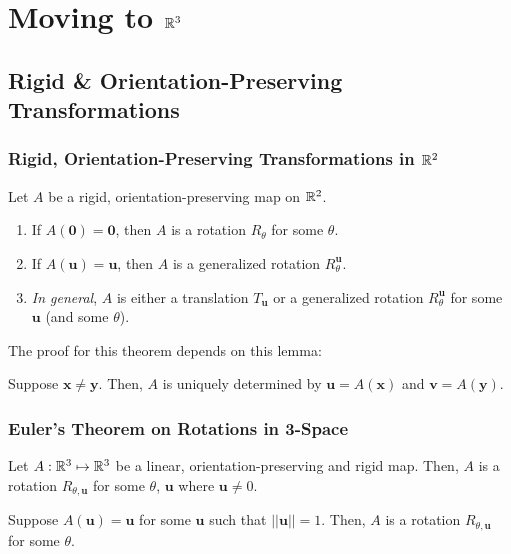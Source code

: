 \documentclass[letterpaper]{article}
\begin{document}
\section{Moving to \texorpdfstring{$\mathbb{R}^3$}{Three-Dimensions}}
\subsection{Rigid \& Orientation-Preserving Transformations}

\subsubsection{Rigid, Orientation-Preserving Transformations in \texorpdfstring{$\mathbb{R}^2$}{Two-Dimensions}}
\begin{theorem}{}{}
    Let $A$ be a rigid, orientation-preserving map on $\mathbb{R}^2$. 
    \begin{enumerate}
        \item If $A(\mathbf{0}) = \mathbf{0}$, then $A$ is a rotation $R_{\theta}$ for some $\theta$. 
        \item If $A(\mathbf{u}) = \mathbf{u}$, then $A$ is a generalized rotation $R_{\theta}^{\mathbf{u}}$. 
        \item \emph{In general}, $A$ is either a translation $T_{\mathbf{u}}$ or a generalized rotation $R_{\theta}^{\mathbf{u}}$ for some $\mathbf{u}$ (and some $\theta$).
    \end{enumerate}
\end{theorem}

The proof for this theorem depends on this lemma:
\begin{lemma}{}{}
    Suppose $\mathbf{x} \neq \mathbf{y}$. Then, $A$ is uniquely determined by $\mathbf{u} = A(\mathbf{x})$ and $\mathbf{v} = A(\mathbf{y})$. 
\end{lemma}

\subsubsection{Euler's Theorem on Rotations in 3-Space}
\begin{theorem}{}{}
    Let $A: \mathbb{R}^3 \mapsto \mathbb{R}^3$ be a linear, orientation-preserving and rigid map. Then, $A$ is a rotation $R_{\theta, \mathbf{u}}$ for some $\theta$, $\mathbf{u}$ where $\mathbf{u} \neq 0$. 
\end{theorem}

\begin{lemma}{}{}
    Suppose $A(\mathbf{u}) = \mathbf{u}$ for some $\mathbf{u}$ such that $||\mathbf{u}|| = 1$. Then, $A$ is a rotation $R_{\theta, \mathbf{u}}$ for some $\theta$. 
\end{lemma}
\end{document}

